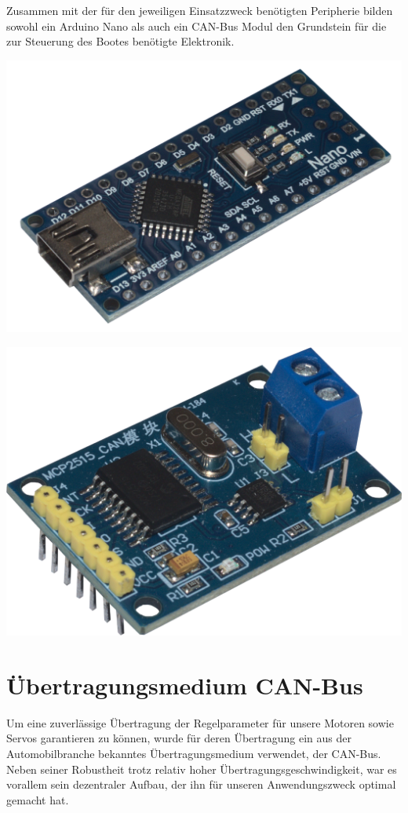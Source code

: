 Zusammen mit der für den jeweiligen Einsatzzweck benötigten Peripherie bilden sowohl ein Arduino Nano als auch ein CAN-Bus Modul den Grundstein für die zur Steuerung des Bootes benötigte Elektronik.  
\begin{minipage}{8cm}
    \includegraphics[width=\textwidth]{Fotos/Arduino_Nano.png}
\end{minipage}
\begin{minipage}{8cm}
\includegraphics[width=\textwidth]{Fotos/CAN_BUS_Shield.png}
\end{minipage}
\section{Übertragungsmedium CAN-Bus}
Um eine zuverlässige Übertragung der Regelparameter für unsere Motoren sowie Servos garantieren zu können, wurde für deren Übertragung ein aus der Automobilbranche bekanntes Übertragungsmedium verwendet, der CAN-Bus. 
Neben seiner Robustheit trotz relativ hoher Übertragungsgeschwindigkeit, war es vorallem sein dezentraler Aufbau, der ihn für unseren Anwendungszweck optimal gemacht hat.
\newpage

